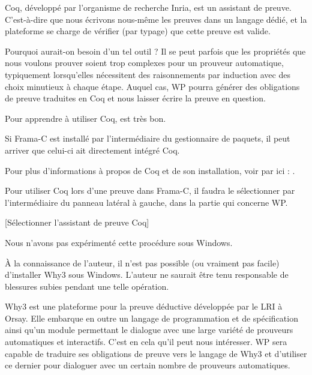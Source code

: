 

Coq, développé par l'organisme de recherche Inria, est un assistant de 
preuve. C'est-à-dire que nous écrivons nous-même les preuves dans un 
langage dédié, et la plateforme se charge de vérifier (par typage) que 
cette preuve est valide.



Pourquoi aurait-on besoin d'un tel outil ? Il se peut parfois que les 
propriétés que nous voulons prouver soient trop complexes pour un prouveur 
automatique, typiquement lorsqu'elles nécessitent des raisonnements par
induction avec des choix minutieux à chaque étape. Auquel cas, WP pourra 
générer des obligations de preuve traduites en Coq et nous laisser écrire 
la preuve en question.



Pour apprendre à utiliser Coq, 
est très bon.



\begin{Information}
Si Frama-C est installé par l'intermédiaire du gestionnaire de 
paquets, il peut arriver que celui-ci ait directement intégré Coq.
\end{Information}


Pour plus d'informations à propos de Coq et de son installation, voir par 
ici : .



Pour utiliser Coq lors d'une preuve dans Frama-C, il faudra le sélectionner 
par l'intermédiaire du panneau latéral à gauche, dans la partie qui concerne
WP.



[Sélectionner l'assistant de preuve Coq]


\begin{Information}
Nous n'avons pas expérimenté cette procédure sous Windows.
\end{Information}




\begin{Warning}
À la connaissance de l'auteur, il n'est pas possible (ou vraiment pas facile) 
d'installer Why3 sous Windows.
L'auteur ne saurait être tenu responsable de blessures subies
pendant une telle opération.
\end{Warning}


Why3 est une plateforme pour la preuve déductive développée par le LRI à Orsay. 
Elle embarque en outre un langage de programmation et de spécification ainsi 
qu'un module permettant le dialogue avec une large variété de prouveurs 
automatiques et interactifs. C'est en cela qu'il peut nous intéresser. WP sera
capable de traduire ses obligations de preuve vers le langage de Why3 et 
d'utiliser ce dernier pour dialoguer avec un certain nombre de prouveurs 
automatiques.



